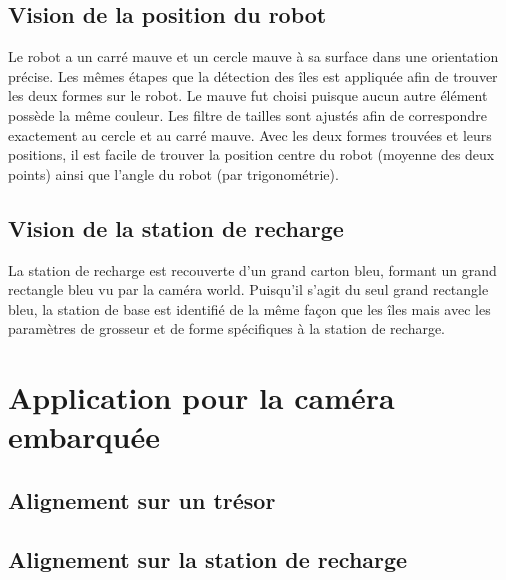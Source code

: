 \subsection{Vision de la position du robot}

Le robot a un carré mauve et un cercle mauve à sa surface dans une orientation précise. Les mêmes étapes que la détection des îles est appliquée afin de trouver les deux formes sur le robot. Le mauve fut choisi puisque aucun autre élément possède la même couleur. Les filtre de tailles sont ajustés afin de correspondre exactement au cercle et au carré mauve. Avec les deux formes trouvées et leurs positions, il est facile de trouver la position centre du robot (moyenne des deux points) ainsi que l'angle du robot (par trigonométrie).


\subsection{Vision de la station de recharge}

La station de recharge est recouverte d'un grand carton bleu, formant un grand rectangle bleu vu par la caméra world. Puisqu'il s'agit du seul grand rectangle bleu, la station de base est identifié de la même façon que les îles mais avec les paramètres de grosseur et de forme spécifiques à la station de recharge.

\section{Application pour la caméra embarquée}
\subsection{Alignement sur un trésor}



\subsection{Alignement sur la station de recharge}
